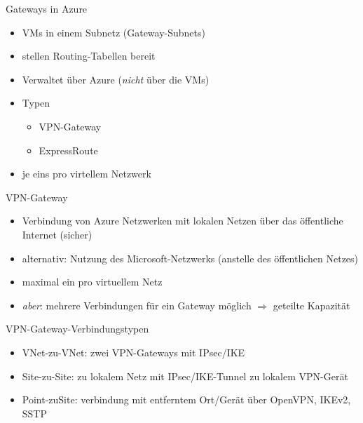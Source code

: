 
\begin{flashcard}[]{Gateways in Azure}
  \begin{itemize}
    \item VMs in einem Subnetz (Gateway-Subnets)
    \item stellen Routing-Tabellen bereit
    \item Verwaltet über Azure (\emph{nicht} über die VMs)
    \item Typen
      \begin{itemize}
        \item VPN-Gateway
        \item ExpressRoute
      \end{itemize}
    \item je eins pro virtellem Netzwerk
  \end{itemize}
\end{flashcard}

\begin{flashcard}[]{VPN-Gateway}
  \begin{itemize}
    \item Verbindung von Azure Netzwerken mit lokalen Netzen über das öffentliche Internet (sicher)
    \item alternativ: Nutzung des Microsoft-Netzwerks (anstelle des öffentlichen Netzes)
    \item maximal ein pro virtuellem Netz
    \item \emph{aber}: mehrere Verbindungen für ein Gateway möglich\newline
      $\Rightarrow$ geteilte Kapazität
  \end{itemize}
\end{flashcard}

\begin{flashcard}[]{VPN-Gateway-Verbindungstypen}
  \begin{itemize}
    \item VNet-zu-VNet: zwei VPN-Gateways mit IPsec/IKE
    \item Site-zu-Site: zu lokalem Netz mit IPsec/IKE-Tunnel zu lokalem VPN-Gerät
    \item Point-zuSite: verbindung mit entferntem Ort/Gerät über OpenVPN, IKEv2, SSTP
  \end{itemize}
\end{flashcard}

